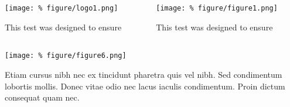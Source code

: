 \documentclass[unknownkeysallowed,usepdftitle=false, parskip=full]{beamer}
\newcommand{\secvariable}{nothing}
\newcommand{\mysection}[1]{\renewcommand{\secvariable}{#1}
}
\begin{document}
\mysection{major}
\begin{frame}\label{\secvariable} %
 \begin{columns}[t]
  
 
  
      \begin{column}[c]{0.45\textwidth}
    {
    
\texttt{[image: \%
figure/logo1.png]}\\

\vspace{20pt}

\begin{center}

This test was designed to ensure

\end{center}

      }
    \end{column}
  
  \begin{column}[c]{0.45\textwidth}

\texttt{[image: \%
figure/figure1.png]}

\vspace{20pt}

\begin{center}

This test was designed to ensure

\end{center}
      
    \end{column}
    
  \end{columns}
\end{frame}

\mysection{slab}
\begin{frame}\label{\secvariable}
\begin{center}
\texttt{[image: \%
figure/figure6.png]}
\end{center}
    \parbox{\linewidth}{

Etiam cursus nibh nec ex tincidunt pharetra quis vel nibh. Sed condimentum lobortis mollis. Donec vitae odio nec lacus iaculis condimentum. Proin dictum consequat quam nec. }

\end{frame}
\end{document}
